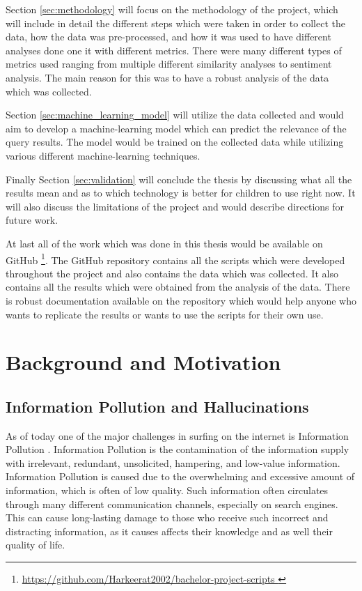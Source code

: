 \documentclass[50pt]{usiinfbachelorproject}
\begin{document}
Section \ref{sec:methodology} will focus on the methodology of the project, which will include in detail the different steps which were taken in order to collect the data, how the data was pre-processed, and how it was used to have different analyses done one it with different metrics. There were many different types of metrics used ranging from multiple different similarity analyses to sentiment analysis. The main reason for this was to have a robust analysis of the data which was collected.

Section \ref{sec:machine_learning_model} will utilize the data collected and would aim to develop a machine-learning model which can predict the relevance of the query results. The model would be trained on the collected data while utilizing various different machine-learning techniques. 

Finally Section \ref{sec:validation} will conclude the thesis by discussing what all the results mean and as to which technology is better for children to use right now. It will also discuss the limitations of the project and would describe directions for future work.

At last all of the work which was done in this thesis would be available on GitHub \footnote{
\url{https://github.com/Harkeerat2002/bachelor-project-scripts }}. The GitHub repository contains all the scripts which were developed throughout the project and also contains the data which was collected. It also contains all the results which were obtained from the analysis of the data. There is robust documentation available on the repository which would help anyone who wants to replicate the results or wants to use the scripts for their own use.

\section{Background and Motivation}
\label{sec:background}

\subsection{Information Pollution and Hallucinations}
As of today one of the major challenges in surfing on the internet is Information Pollution \cite{pandita2014information}. Information Pollution is the contamination of the information supply with irrelevant, redundant, unsolicited, hampering, and low-value information. Information Pollution is caused due to the overwhelming and excessive amount of information, which is often of low quality. Such information often circulates through many different communication channels, especially on search engines. This can cause long-lasting damage to those who receive such incorrect and distracting information, as it causes affects their knowledge and as well their quality of life.
\end{document}
